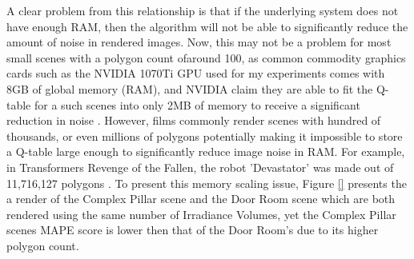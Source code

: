 \documentclass[../dissertation.tex]{subfiles}
\begin{document}

A clear problem from this relationship is that if the underlying system does not have enough RAM, then the algorithm will not be able to significantly reduce the amount of noise in rendered images. Now, this may not be a problem for most small scenes with a polygon count ofaround 100, as common commodity graphics cards such as the NVIDIA 1070Ti GPU used for my experiments comes with 8GB of global memory (RAM), and NVIDIA claim they are able to fit the Q-table for a such scenes into only 2MB of memory to receive a significant reduction in noise \cite{dahm2017learning}. However, films commonly render scenes with hundred of thousands, or even millions of polygons potentially making it impossible to store a Q-table large enough to significantly reduce image noise in RAM. For example, in Transformers Revenge of the Fallen, the robot 'Devastator' was made out of 11,716,127 polygons \cite{devastator}. To present this memory scaling issue, Figure \ref{} presents the a render of the Complex Pillar scene and the Door Room scene which are both rendered using the same number of Irradiance Volumes, yet the Complex Pillar scenes MAPE score is lower then that of the Door Room's due to its higher polygon count.\\

\end{document}
